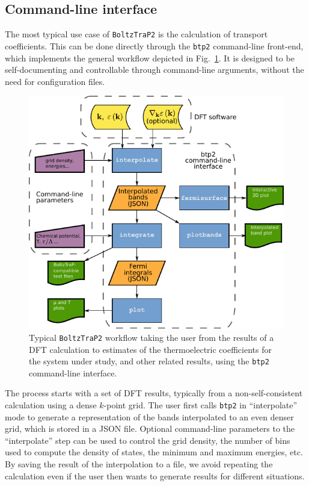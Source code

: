 \documentclass[final,5p,times,twocolumn,sort&compress]{elsarticle}
\begin{document}
\subsection{Command-line interface}

The most typical use case of \texttt{BoltzTraP2} is the calculation of transport coefficients. This can be done directly through the \texttt{btp2} command-line front-end, which implements the general workflow depicted in Fig.~\ref{fig:workflow}. It is designed to be self-documenting and controllable through command-line arguments, without the need for configuration files.
\begin{figure}
  \begin{center}
    \includegraphics[width=\columnwidth]{workflow}
  \end{center}
  \caption{Typical \texttt{BoltzTraP2} workflow taking the user from the results of a DFT calculation to estimates of the thermoelectric coefficients for the system under study, and other related results, using the \texttt{btp2} command-line interface.}
  \label{fig:workflow}
\end{figure}

The process starts with a set of DFT results, typically from a non-self-consistent calculation using a dense $k$-point grid. The user first calls \texttt{btp2} in ``interpolate'' mode to generate a representation of the bands interpolated to an even denser grid, which is stored in a JSON file. Optional command-line parameters to the ``interpolate'' step can be used to control the grid density, the number of bins used to compute the density of states, the minimum and maximum energies, etc. By saving the result of the interpolation to a file, we avoid repeating the calculation even if the user then wants to generate results for different situations.
\end{document}
